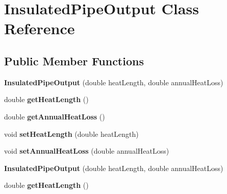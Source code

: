 \hypertarget{class_insulated_pipe_output}{}\section{Insulated\+Pipe\+Output Class Reference}
\label{class_insulated_pipe_output}
\subsection*{Public Member Functions}
\begin{DoxyCompactItemize}
\item 
\mbox{\label{class_insulated_pipe_output_ae9ef30156790c18f04193ed7fae3695a}} 
{\bfseries Insulated\+Pipe\+Output} (double heat\+Length, double annual\+Heat\+Loss)
\item 
\mbox{\label{class_insulated_pipe_output_a65e3496378f7d837915f0ed194c4fefa}} 
double {\bfseries get\+Heat\+Length} ()
\item 
\mbox{\label{class_insulated_pipe_output_a6ef77da2d904b9498f68abfd78df35c2}} 
double {\bfseries get\+Annual\+Heat\+Loss} ()
\item 
\mbox{\label{class_insulated_pipe_output_aa94860c894820d6e937d850dbfdd938f}} 
void {\bfseries set\+Heat\+Length} (double heat\+Length)
\item 
\mbox{\label{class_insulated_pipe_output_a4519c6b375daa98354d334b9067aaef3}} 
void {\bfseries set\+Annual\+Heat\+Loss} (double annual\+Heat\+Loss)
\item 
\mbox{\label{class_insulated_pipe_output_ae9ef30156790c18f04193ed7fae3695a}} 
{\bfseries Insulated\+Pipe\+Output} (double heat\+Length, double annual\+Heat\+Loss)
\item 
\mbox{\label{class_insulated_pipe_output_a65e3496378f7d837915f0ed194c4fefa}} 
double {\bfseries get\+Heat\+Length} ()
\item 
\mbox{\label{class_insulated_pipe_output_a6ef77da2d904b9498f68abfd78df35c2}} 

\end{DoxyCompactItemize}
